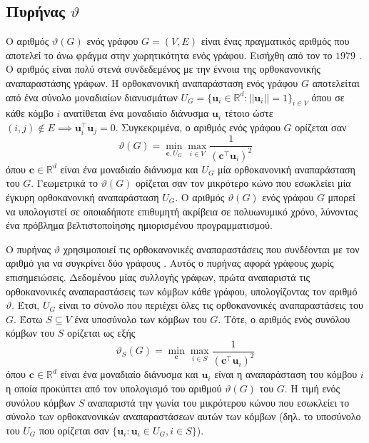 \subsection{Πυρήνας  $\vartheta$}
\label{ssec:lovasz}
Ο αριθμός  $\vartheta(G)$ ενός γράφου $G=(V,E)$ είναι ένας πραγματικός αριθμός που αποτελεί το άνω φράγμα στην χωρητικότητα  ενός γράφου.
Εισήχθη από τον  το $1979$ \cite{lovasz1979shannon}.
Ο αριθμός  είναι πολύ στενά συνδεδεμένος με την έννοια της ορθοκανονικής αναπαραστάσης γράφων.
Η ορθοκανονική αναπαράσταση ενός γράφου $G$ αποτελείται από ένα σύνολο μοναδιαίων διανυσμάτων $U_G = \{ \mathbf{u}_i \in \mathbb{R}^d : || \mathbf{u}_i || = 1 \}_{i \in V}$ όπου σε κάθε κόμβο $i$ ανατίθεται ένα μοναδιαίο διάνυσμα $\mathbf{u}_i$ τέτοιο ώστε $(i,j) \not \in E \implies \mathbf{u}_i^\top \mathbf{u}_j = 0$.
Συγκεκριμένα, ο αριθμός  ενός γράφου $G$ ορίζεται σαν
\begin{equation}
    \vartheta(G) = \min_{\mathbf{c}, U_G} \max_{i \in V} \frac{1}{(\mathbf{c}^\top \mathbf{u}_i)^2}
\end{equation}
όπου $\mathbf{c} \in \mathbb{R}^d$ είναι ένα μοναδιαίο διάνυσμα και $U_G$ μία ορθοκανονική αναπαράσταση του $G$. 
Γεωμετρικά το $\vartheta(G)$ ορίζεται σαν τον μικρότερο κώνο που εσωκλείει μία έγκυρη ορθοκανονική αναπαράσταση $U_G$.
Ο αριθμός  $\vartheta(G)$ ενός γράφου $G$ μπορεί να υπολογιστεί σε οποιαδήποτε επιθυμητή ακρίβεια σε πολυωνυμικό χρόνο, λύνοντας ένα πρόβλημα βελτιστοποίησης ημιορισμένου προγραμματισμού.

Ο πυρήνας  $\vartheta$ χρησιμοποιεί τις ορθοκανονικές αναπαραστάσεις που συνδέονται με τον αριθμό  για να συγκρίνει δύο γράφους \cite{johansson2014global}.
Αυτός ο πυρήνας αφορά γράφους χωρίς επισημειώσεις.
Δεδομένου μίας συλλογής γράφων, πρώτα αναπαριστά τις ορθοκανονικές αναπαραστάσεις των κόμβων κάθε γράφου, υπολογίζοντας τον αριθμό  $\vartheta$.
Έτσι, $U_G$ είναι το σύνολο που περιέχει όλες τις ορθοκανονικές αναπαραστάσεις του $G$.
Έστω $S \subseteq V$ ένα υποσύνολο των κόμβων του $G$.
Τότε, ο αριθμός  ενός συνόλου κόμβων του $S$ ορίζεται ως εξής
\begin{equation}
    \vartheta_S(G) = \min_{\mathbf{c}} \max_{i \in S} \frac{1}{(\mathbf{c}^\top \mathbf{u}_i)^2}
\end{equation}
όπου $\mathbf{c} \in \mathbb{R}^d$ είναι ένα μοναδιαίο διάνυσμα και $\mathbf{u}_i$ είναι η αναπαράσταση του κόμβου $i$ η οποία προκύπτει από τον υπολογισμό του αριθμού  $\vartheta(G)$ του $G$.
Η τιμή  ενός συνόλου κόμβων $S$ αναπαριστά την γωνία του μικρότερου κώνου που εσωκλείει το σύνολο των ορθοκανονικών αναπαραστάσεων αυτών των κόμβων (δηλ. το υποσύνολο του $U_G$ που ορίζεται σαν $\{ \mathbf{u}_i : \mathbf{u}_i \in U_G, i \in S \}$).

